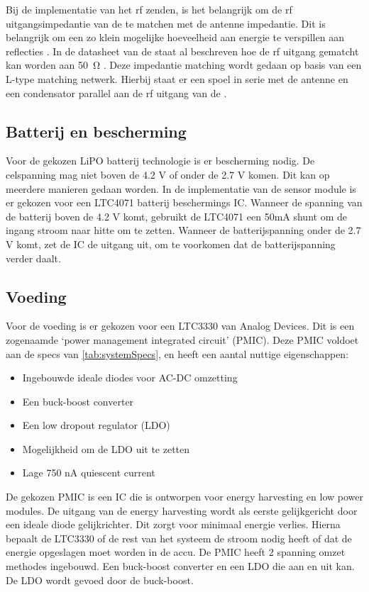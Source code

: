 Bij de implementatie van het rf zenden, is het belangrijk om de rf uitgangsimpedantie van de \mcu te matchen met de antenne impedantie. Dit is belangrijk om een zo klein mogelijke hoeveelheid aan energie te verspillen aan reflecties \cite{FundamentalsofAppliedElectromagnetics}. In de datasheet van de \mcu staat al beschreven hoe de rf uitgang gematcht kan worden aan \qty{50}{\ohm} \cite{nrf52810}. Deze impedantie matching wordt gedaan op basis van een L-type matching netwerk. Hierbij staat er een spoel in serie met de antenne en een condensator parallel aan de rf uitgang van de \mcu \cite{nrf52810}.
\subsection{Batterij en bescherming}

Voor de gekozen LiPO batterij technologie is er bescherming nodig. De celspanning mag niet boven de 4.2 V of onder de 2.7 V komen. Dit kan op meerdere manieren gedaan worden. In de implementatie van de sensor module is er gekozen voor een LTC4071 batterij beschermings IC. Wanneer de spanning van de batterij boven de 4.2 V komt, gebruikt de LTC4071 een 50mA shunt om de ingang stroom naar hitte om te zetten. Wanneer de batterijspanning onder de 2.7 V komt, zet de IC de uitgang uit, om te voorkomen dat de batterijspanning verder daalt.

\subsection{Voeding}
Voor de voeding is er gekozen voor een LTC3330 van Analog Devices. Dit is een zogenaamde `power management integrated circuit' (PMIC). Deze PMIC voldoet aan de specs van \cref{tab:systemSpecs}, en heeft een aantal nuttige eigenschappen:
\begin{itemize}
    \item Ingebouwde ideale diodes voor AC-DC omzetting
    \item Een buck-boost converter
    \item Een low dropout regulator (LDO)
    \item Mogelijkheid om de LDO uit te zetten
    \item Lage 750 nA quiescent current
\end{itemize}

De gekozen PMIC is een IC die is ontworpen voor energy harvesting en low power modules. De uitgang van de energy harvesting wordt als eerste gelijkgericht door een ideale diode gelijkrichter. Dit zorgt voor minimaal energie verlies. Hierna bepaalt de LTC3330 of de rest van het systeem de stroom nodig heeft of dat de energie opgeslagen moet worden in de accu. De PMIC heeft 2 spanning omzet methodes ingebouwd. Een buck-boost converter en een LDO die aan en uit kan. De LDO wordt gevoed door de buck-boost.

